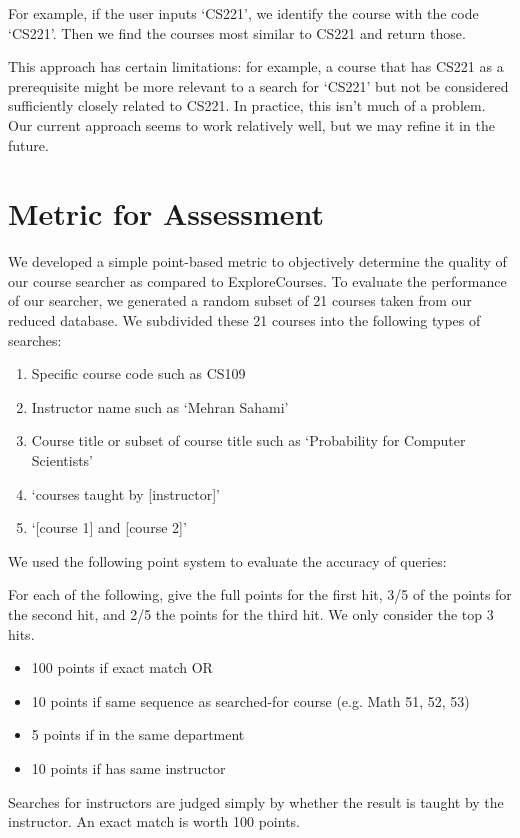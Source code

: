 \documentclass[12pt]{article}
\begin{document}
For example, if the user inputs `CS221', we identify the course with
the code `CS221'. Then we find the courses most similar to CS221 and
return those.

This approach has certain limitations: for example, a course that has
CS221 as a prerequisite might be more relevant to a search for `CS221'
but not be considered sufficiently closely related to CS221. In
practice, this isn't much of a problem. Our current approach seems to
work relatively well, but we may refine it in the future.

\section*{Metric for Assessment}
We developed a simple point-based metric to objectively determine the
quality of our course searcher as compared to ExploreCourses. To
evaluate the performance of our searcher, we generated a random subset
of 21 courses taken from our reduced database. We subdivided these 21
courses into the following types of searches: 

\begin{enumerate}
\item Specific course code such as CS109
\item Instructor name such as `Mehran Sahami'
\item Course title or subset of course title such as `Probability for Computer Scientists'
\item `courses taught by [instructor]'
\item `[course 1] and [course 2]'
\end{enumerate}

We used the following point system to evaluate the accuracy of queries: 

For each of the following, give the full points for the first hit, 3/5
of the points for the second hit, and 2/5 the points for the third
hit. We only consider the top 3 hits.

\begin{itemize}
\item 100 points if exact match OR
\item 10 points if same sequence as searched-for course (e.g. Math 51,
  52, 53)
\item 5 points if in the same department
\item 10 points if has same instructor
\end{itemize}

Searches for instructors are judged simply by whether the result is
taught by the instructor. An exact match is worth 100 points.
\end{document}
